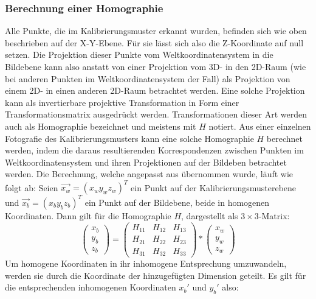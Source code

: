 \subsubsection{Berechnung einer Homographie}
Alle Punkte, die im Kalibrierungsmuster erkannt wurden, befinden sich wie oben beschrieben auf der X-Y-Ebene. Für sie lässt sich also die Z-Koordinate auf null setzen. Die Projektion dieser Punkte vom Weltkoordinatensystem in die Bildebene kann also anstatt von einer Projektion vom 3D- in den 2D-Raum (wie bei anderen Punkten im Weltkoordinatensystem der Fall) als Projektion von einem 2D- in einen anderen 2D-Raum betrachtet werden. Eine solche Projektion kann als invertierbare projektive Transformation in Form einer Transformationsmatrix ausgedrückt werden. Transformationen dieser Art werden auch als Homographie bezeichnet und meistens mit \(H\) notiert. Aus einer einzelnen Fotografie des Kalibrierungsmusters kann eine solche Homographie \(H\) berechnet werden, indem die daraus resultierenden Korrespondenzen zwischen Punkten im Weltkoordinatensystem und ihren Projektionen auf der Bildeben betrachtet werden. Die Berechnung, welche angepasst aus \cite{Kriegman:07} übernommen wurde, läuft wie folgt ab:
\newline
Seien \(\vec{x_w} = \left(x_w y_w z_w\right)^{T}\) ein Punkt auf der Kalibrierungsmusterebene und \(\vec{x_b} = \left(x_b y_b z_b\right)^{T}\) ein Punkt auf der Bildebene, beide in homogenen Koordinaten. Dann gilt für die Homographie \(H\), dargestellt als \(3\times 3\)-Matrix:
\begin{equation}
\label{equ:homographie1}
	\left(\begin{array}{c}x_b\\y_b\\z_b\end{array}\right) =  \begin{pmatrix}
			H_{11} & H_{12} & H_{13} \\
			H_{21} & H_{22} & H_{23} \\
			H_{31} & H_{32} & H_{33}
		\end{pmatrix} * \left(\begin{array}{c}x_w\\y_w\\z_w\end{array}\right)
\end{equation}
Um homogene Koordinaten in ihr inhomogene Entsprechung umzuwandeln, werden sie durch die Koordinate der hinzugefügten Dimension geteilt. Es gilt für die entsprechenden inhomogenen Koordinaten \(x_b\prime\) und \(y_b\prime\) also:
